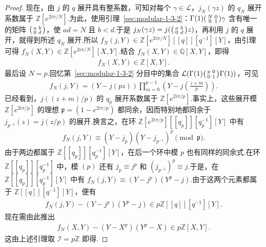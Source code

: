 \begin{proof}
现在，由 $j$ 的 $q$ 展开具有整系数，可知对每个 $\gamma\in\mathcal L$，$j_N(\gamma z)$ 的 $q_N$ 展开系数属于 $\mathbb Z[e^{2i\pi/N}]$.为此，使用引理~\ref{sec:modular-1-3-2}：$\Gamma(1)\begin{psmallmatrix}N&0\\0&1\end{psmallmatrix}\gamma$ 含有唯一的矩阵 $\begin{psmallmatrix}a&b\\0&d\end{psmallmatrix}$，使 $ad=N$ 且 $b<d$.于是 $j_N(\gamma z)=j(\begin{psmallmatrix}a&b\\0&d\end{psmallmatrix}z)$，再利用 $j$ 的 $q$ 展开，就得到所述 $q_N$ 展开.所以 $f_N(j,Y)\in\mathbb Z[e^{2i\pi/N}][[q]][q^{-1}][Y]$，由引理可得 $f_N(X,Y)\in\mathbb Z[e^{2i\pi/N}][X,Y]$.结合 $f_N(X,Y)\in\mathbb Q[X,Y]$，即得
\begin{align*}
f_N(X,Y)\in\mathbb Z[X,Y].
\end{align*}
最后设 $N=p$.回忆第~\ref{sec:modular-1-3-2} 分目中的集合 $\mathcal L(\Gamma(1)\begin{psmallmatrix}p&0\\0&1\end{psmallmatrix}\Gamma(1))$，可见
\begin{align*}
f_N(j,Y)=(Y-j(pz))\prod_{m=0}^{p-1}\left(Y-j\left(\frac{z+m}{p}\right)\right).
\end{align*}
已经看到，$j((z+m)/p)$ 的 $q_p$ 展开系数属于 $\mathbb Z[e^{2i\pi/p}]$.事实上，这些展开模 $\mathbb Z[e^{2i\pi/p}]$ 的理想 $\mathfrak p=(1-e^{2i\pi/p})$ 都同余，因而特别地都同余于 $j_{p^{-1}}(z)=j(z/p)$ 的展开.换言之，在环 $\mathbb Z[e^{2i\pi/p}][[q_p]][q_p^{-1}][Y]$ 中有
\begin{align*}
f_N(j,Y)\equiv(Y-j_p)(Y-j_{p^{-1}})^p\pmod{\mathfrak p}.
\end{align*}
由于两边都属于 $\mathbb Z[[q_p]][q_p^{-1}][Y]$，在后一个环中模 $p$ 也有同样的同余式.在环 $\mathbb Z[[q_p]][q_p^{-1}]$ 中，模 $(p)$ 还有 $j_p\equiv j^p$ 和 $(j_{p^{-1}})^p\equiv j$.于是，在 $\mathbb Z[[q_p]][q_p^{-1}][Y]$ 中有 $f_N(j,Y)\equiv(Y-j^p)(Y^p-j)$.由于这两个元素都属于 $\mathbb Z[[q]][q^{-1}][Y]$，便有
\begin{align*}
f_N(j,Y)-(Y-j^p)(Y^p-j)\in p\mathbb Z[[q]][q^{-1}][Y].
\end{align*}
现在需由此推出
\begin{align*}
f_N(X,Y)-(Y-X^p)(Y^p-X)\in p\mathbb Z[X,Y].
\end{align*}
这由上述引理取 $\mathcal I=p\mathbb Z$ 即得.

\end{proof}

